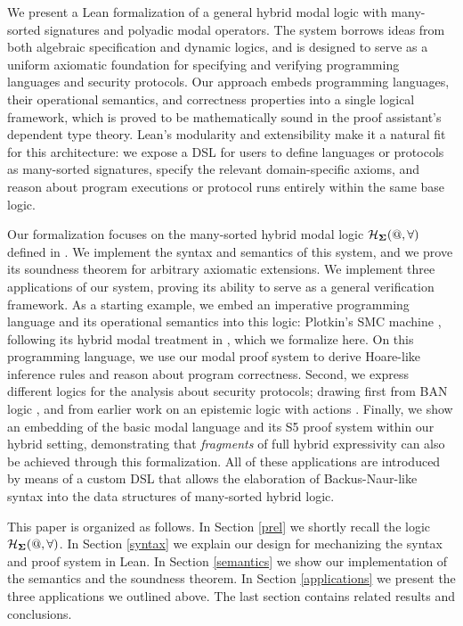 \documentclass{easychair}
\theoremstyle{remark}
\begin{document}
We present a Lean \cite{lean4} formalization of a general hybrid modal logic with many-sorted signatures and polyadic modal operators. The system borrows ideas from both algebraic specification and dynamic logics, and is designed to serve as a uniform axiomatic foundation for specifying and verifying programming languages and security protocols. Our approach embeds programming languages, their operational semantics, and correctness properties into a single logical framework, which is proved to be mathematically sound in the proof assistant's dependent type theory. Lean's modularity and extensibility make it a natural fit for this architecture: we expose a DSL for users to define languages or protocols as many-sorted signatures, specify the relevant domain-specific axioms, and reason about program executions or protocol runs entirely within the same base logic.

Our formalization focuses on the many-sorted hybrid modal logic $\mathcal{H}_{\bf \Sigma}(@, \forall)$ defined in \cite{tableaux}. We implement the syntax and semantics of this system, and we prove its soundness theorem for arbitrary axiomatic extensions. We implement three applications of our system, proving its ability to serve as a general verification framework. As a starting example, we embed an imperative programming language and its operational semantics into this logic: Plotkin's SMC machine \cite{plotkin}, following its hybrid modal treatment in \cite{tableaux}, which we formalize here. On this programming language, we use our modal proof system to derive Hoare-like inference rules and reason about program correctness. Second, we express different logics for the analysis about security protocols; drawing first from BAN logic \cite{ban}, and from earlier work on an epistemic logic with actions \cite{ramics}. Finally, we show an embedding of the basic modal language and its S5 proof system within our hybrid setting, demonstrating that \textit{fragments} of full hybrid expressivity can also be achieved through this formalization.
All of these applications are introduced by means of a custom DSL that allows the elaboration of Backus-Naur-like syntax into the data structures of many-sorted hybrid logic.



This paper is organized as follows. In Section \ref{prel} we shortly recall the logic $\mathcal{H}_{\bf \Sigma}(@, \forall)$. In Section \ref{syntax} we explain our design for mechanizing the syntax and proof system in Lean. In Section \ref{semantics} we show our implementation of the semantics and the soundness theorem. In Section  \ref{applications} we present the three applications we outlined above. The last section contains related results and conclusions.
\end{document}
